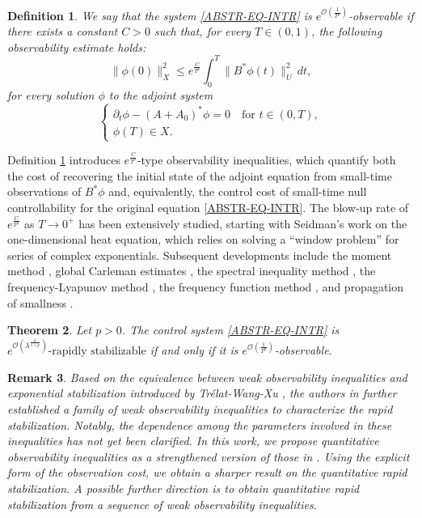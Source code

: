 \documentclass[a4paper]{article}
\newtheorem{theorem}{Theorem}[section]
\newtheorem{remark}[theorem]{Remark}
\newtheorem{definition}[theorem]{Definition}
\numberwithin{equation}{section}
\begin{document}
\begin{definition}\label{Def-OBS-ABSTR}
 We say that the system \eqref{ABSTR-EQ-INTR} is {$e^{\mathcal O(\frac{1}{T^p})}$-observable} if there exists a constant $C>0$ such that, for every $T\in(0,1)$, the following observability estimate holds:
\begin{equation}\label{q-obs-abstr}
\|\phi(0)\|_X^2\le e^{\frac{C}{T^p}}\int_0^T \|B^*\phi(t)\|_U^2\,dt,
\end{equation}
for every solution $\phi$ to the adjoint system
$$\begin{cases}
\partial_t\phi-(A+A_0)^*\phi=0 \quad \text{for } t\in(0,T),\\
\phi(T)\in X.
\end{cases}$$
\end{definition}
Definition \ref{Def-OBS-ABSTR} introduces $e^{\frac{C}{T^p}}$-type observability inequalities, which quantify both the cost of recovering the initial state of the adjoint equation from small-time observations of $B^*\phi$ and, equivalently, the control cost of small-time null controllability for the original equation \eqref{ABSTR-EQ-INTR}. The blow-up rate of $e^{\frac{C}{T^p}}$ as $T \to 0^+$ has been extensively studied, starting with Seidman's work \cite{Seid} on the one-dimensional heat equation, which relies on solving  a ``window problem'' for series of complex exponentials. Subsequent developments include the moment method \cite{LP2,TT}, global Carleman estimates \cite{FZL,FI}, the spectral inequality method \cite{AEWZ,M}, the frequency-Lyapunov method \cite{X1,X2}, the frequency function method \cite{WK}, and propagation of smallness \cite{EMZ}. 

\begin{theorem}\label{EQV}
Let $p>0$. The control system \eqref{ABSTR-EQ-INTR} is $e^{\mathcal O(\lambda^{\frac{p}{1+p}})}\text{-rapidly stabilizable}$ if and only if it is $e^{\mathcal O(\frac{1}{T^p})}$-observable.
\end{theorem}

\begin{remark}
Based on the equivalence between weak observability inequalities and exponential stabilization introduced by Tr\'elat-Wang-Xu \cite{TWX}, the authors in \cite{LWXY} further established a family of weak observability inequalities to characterize the rapid stabilization. Notably, the dependence among the parameters involved in these inequalities has not yet been clarified. In this work, we propose quantitative observability inequalities as a strengthened version of those in \cite{LWXY}. Using the explicit form of the observation cost, we obtain a sharper result on the quantitative rapid stabilization. A possible further direction is to obtain quantitative rapid stabilization from a sequence of weak observability inequalities. 
\end{remark}
\end{document}
